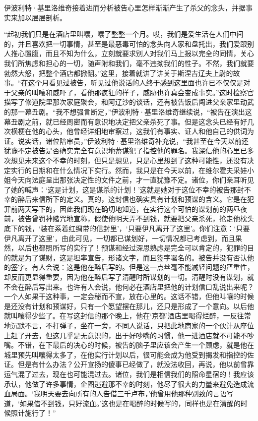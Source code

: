 \par 伊波利特·基里洛维奇接着进而分析被告心里怎样渐渐产生了杀父的念头，并据事实来加以层层剖析。
\par “起初我们只是在酒店里叫嚷，嚷了整整一个月。哎，我们是爱生活在人们中间的，并且喜欢把一切事情，甚至是最恶毒可怕的念头向人家和盘托出，我们爱跟别人推心置腹，而且不知为什么，立刻就要求别人对我们马上报以完全的同情，关心我们所焦虑和担心的一切，随声附和我们，毫不违拗我们的性子。不然，我们就要勃然大怒，把整个酒店都掀翻。”这里，接着就讲了讲关于斯涅吉辽夫上尉的故事。“在这个月看见过被告，听见过他说话的人终于感到这里面也许已不仅仅是对于父亲的叫嚷和威吓了，看他那疯狂的样子，威胁也许真会变成事实。”这时检察官描写了修道院里那次家庭聚会，和阿辽沙的谈话，还有被告饭后闯进父亲家里动武的那一幕丑剧。“我不想强言断定，”伊波利特·基里洛维奇继续说，“被告在演出这幕丑剧之前，就已经周密而有意识地决定把父亲杀死了事。但是这念头已经有好几次横梗在他的心头，他曾经详细地审察过，这我们有事实、证人和他自己的供词为证。说实话，诸位陪审员，”伊波利特·基里洛维奇补充说，“我甚至在今天以前还犹豫不定被告是否确实完全有意识地蓄谋犯了指控他的罪名。我深信他的心里已多次想见未来这个不幸的时刻，但只是想见，只是心里想到了这种可能性，还没有决定实行的日期和在什么情况下实行。然而，我只是在今天以前，在维尔霍夫采娃小姐今天向法庭呈出那张决定性的文件之前，才一直犹豫不定。诸位，你们亲耳听见了她的喊声：‘这是计划，这是谋杀的计划！’这就是她对于这位不幸的被告那封不幸的醉后来信所下的定义。真的，这封信也确实具有计划和预谋的含义。它是在犯罪前两天写下的，因此我们现在确切地知道，在实行这个可怕的谋划前的两昼夜前，被告曾罚神赌咒地宣称，假使他明天弄不到钱，就要把父亲杀死，抢走他枕头底下的钱，‘装在系着红绸带的信封里’，‘只要伊凡离开了这里’。你们注意：‘只要伊凡离开了这里’，由此可见，一切都已谋划好，一切情况都已考虑到，而且果然，以后也都照所写的实行了！预谋和经过深思熟虑是完全可以肯定的，犯罪的目的就是为了谋财，这是坦率宣告，形诸文字，而且签字署名的。被告并没有否认他的签字。有人会说：这是他在醉后写的。但是这一点丝毫不能减轻问题的严重性，却反而更显得重要，因为他在醉后写了清醒时所谋划的一切。清醒时没有谋划，就不会在醉后写出来。也许有人会说，他何必在酒店里把他的计划信口乱说出来呢？一个人如果干这种事，一定会秘而不宣，放在心里的。这话不错，但他叫嚷的时候是还没有计划和预谋好，只有一个愿望摆在那儿，还只是形成了一个意向。以后他就叫嚷得少些了。在写这封信的那个晚上，他在‘京都’酒店里喝得烂醉，一反往常地沉默不言，不打弹子，坐在一旁，不同人说话，只把此地商家的一个伙计从座位上赶了开去，但这几乎是无意识的，出于好吵嘴的习惯，他一进酒店就不可能不吵嘴。不错，在下最后的决心的时候，被告的脑子里应该会产生一个顾虑，就是他在城里预先叫嚷得太多了，在他实行计划以后，很可能会成为他受到揭发和指控的佐证。但是有什么办法？公开宣扬的傻事已经做了，就没法收回，再说，他以前曾靠运气混了过去，现在也可能混过去。诸位，我们是相信我们的照命星宿的！我应该承认，他做了许多事情，企图逃避那不幸的时刻，他尽了很大的力量来避免造成流血局面。‘我明天要去向所有的人告借三千卢布，’他曾用他那种别致的言语写道，‘如果借不到钱，只好流血。’这也是在喝醉的时候写的，同样也是在清醒的时候照计施行了！”
